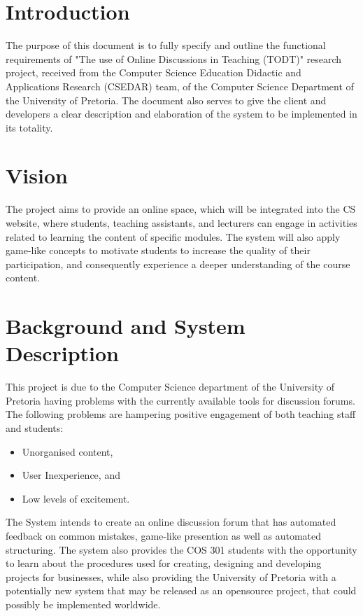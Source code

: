 \documentclass[11pt]{article}
\begin{document}


\tableofcontents	%
\newpage

\listoffigures		%

\newpage


\section{Introduction}

The purpose of this document is to fully specify and outline the functional requirements of "The use of Online Discussions in Teaching (TODT)" research project, received from the Computer Science Education Didactic and Applications Research (CSEDAR) team, of the Computer Science Department of the University of Pretoria. The document also serves to give the client and developers a clear description and elaboration of the system to be implemented in its totality.

\section{Vision}

The project aims to provide an online space, which will be integrated into the CS website, where students, teaching assistants, and lecturers can engage in activities related to learning the content of specific modules. The system will also apply game-like concepts to motivate students to increase the quality of their participation, and consequently experience a deeper understanding of the course content.

\section{Background and System Description}

This project is due to the Computer Science department of the University of Pretoria having problems with the currently available tools for discussion forums. The following problems are hampering positive engagement of both teaching staff and students:
\begin{itemize}
\item Unorganised content,
\item User Inexperience, and 
\item Low levels of excitement.
\end{itemize}
The System intends to create an online discussion forum that has automated feedback on common mistakes, game-like presention as well as automated structuring. \newline
The system also provides the COS 301 students with the opportunity to learn about the procedures used for creating, designing and developing projects for businesses, while also providing the University of Pretoria with a potentially new system that may be released as an opensource project, that could possibly be implemented worldwide.
\end{document}
